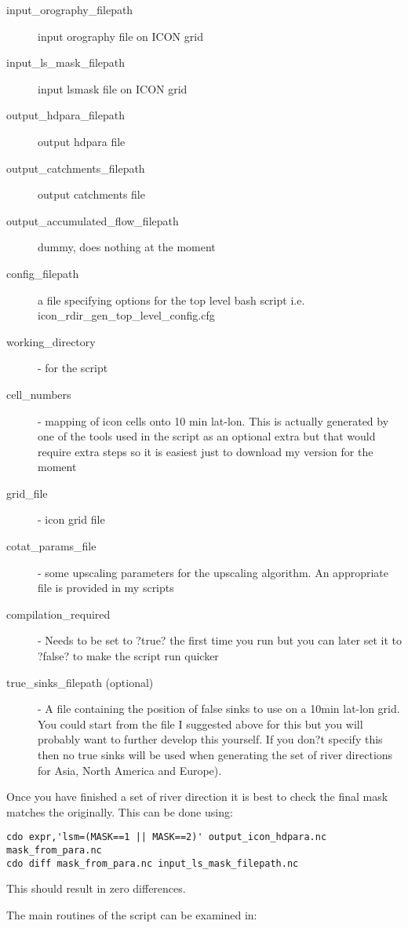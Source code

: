 \documentclass{article}
\begin{document}
\begin{description}
\item[input\_orography\_filepath] input orography file on ICON grid
\item[input\_ls\_mask\_filepath] input lsmask file on ICON grid
\item[output\_hdpara\_filepath] output hdpara file 
\item[output\_catchments\_filepath] output catchments file
\item[output\_accumulated\_flow\_filepath] dummy, does nothing at the moment
\item[config\_filepath] a file specifying options for the top level bash script i.e. icon\_rdir\_gen\_top\_level\_config.cfg
\item[working\_directory] - for the script
\item[cell\_numbers] - mapping of icon cells onto 10 min lat-lon. This is actually generated by one of the tools used in the script as an optional extra but that would require extra steps so it is easiest just to download my version for the moment
\item[grid\_file] - icon grid file
\item[cotat\_params\_file] - some upscaling parameters for the upscaling algorithm. An appropriate file is provided in my scripts
\item[compilation\_required] - Needs to be set to ?true? the first time you run but you can later set it to ?false? to make the script run quicker
\item[true\_sinks\_filepath (optional)] - A file containing the position of false sinks to use on a 10min lat-lon grid. You could start from the file I suggested above for this but you will probably want to further develop this yourself. If you don?t specify this then no true sinks will be used when generating the set of river directions for Asia, North America and Europe).
\end{description}

Once you have finished a set of river direction it is best to check the final mask matches the originally. This can be done using:
\begin{lstlisting}[style=bash_input,breaklines=true]
cdo expr,'lsm=(MASK==1 || MASK==2)' output_icon_hdpara.nc mask_from_para.nc
cdo diff mask_from_para.nc input_ls_mask_filepath.nc
\end{lstlisting} 
This should result in zero differences.

The main routines of the script can be examined in:
\end{document}
